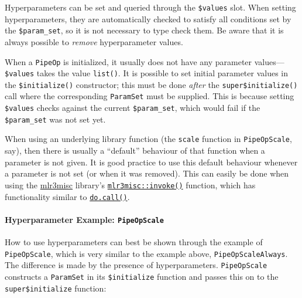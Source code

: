 \documentclass[]{article}
\newenvironment{Shaded}{\begin{snugshade}}{\end{snugshade}}
\newcommand{\NormalTok}[1]{#1}
\newcommand{\OperatorTok}[1]{\textcolor[rgb]{0.81,0.36,0.00}{\textbf{#1}}}
\let\oldparagraph\paragraph
\renewcommand{\paragraph}[1]{\oldparagraph{#1}\mbox{}}
\renewenvironment{Shaded} {\begin{snugshade}\small} {\end{snugshade}}
\begin{document}
Hyperparameters can be set and queried through the \texttt{\$values} slot.
When setting hyperparameters, they are automatically checked to satisfy all conditions set by the \texttt{\$param\_set}, so it is not necessary to type check them.
Be aware that it is always possible to \emph{remove} hyperparameter values.

When a \texttt{PipeOp} is initialized, it usually does not have any parameter values---\texttt{\$values} takes the value \texttt{list()}.
It is possible to set initial parameter values in the \texttt{\$initialize()} constructor; this must be done \emph{after} the \texttt{super\$initialize()} call where the corresponding \texttt{ParamSet} must be supplied.
This is because setting \texttt{\$values} checks against the current \texttt{\$param\_set}, which would fail if the \texttt{\$param\_set} was not set yet.

When using an underlying library function (the \texttt{scale} function in \texttt{PipeOpScale}, say), then there is usually a ``default'' behaviour of that function when a parameter is not given.
It is good practice to use this default behaviour whenever a parameter is not set (or when it was removed).
This can easily be done when using the \href{https://mlr3misc.mlr-org.com}{mlr3misc} library's \href{https://mlr3misc.mlr-org.com/reference/invoke.html}{\texttt{mlr3misc::invoke()}} function, which has functionality similar to \href{https://www.rdocumentation.org/packages/base/topics/do.call}{\texttt{do.call()}}.

\hypertarget{hyperparameter-example-pipeopscale}{%
\paragraph{\texorpdfstring{Hyperparameter Example: \texttt{PipeOpScale}}{Hyperparameter Example: PipeOpScale}}\label{hyperparameter-example-pipeopscale}}

How to use hyperparameters can best be shown through the example of \texttt{PipeOpScale}, which is very similar to the example above, \texttt{PipeOpScaleAlways}.
The difference is made by the presence of hyperparameters. \texttt{PipeOpScale} constructs a \texttt{ParamSet} in its \texttt{\$initialize} function and passes this on to the \texttt{super\$initialize} function:

\begin{Shaded}
\end{Shaded}
\end{document}
